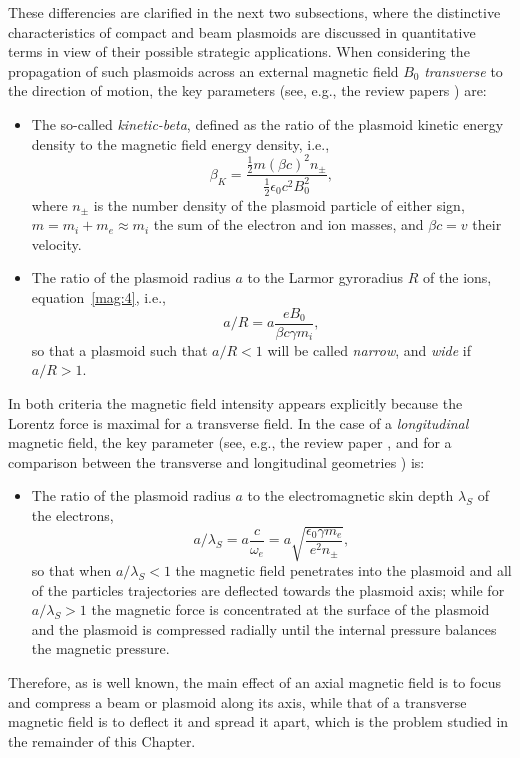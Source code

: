 \documentclass [12pt,a4paper,     ]{report} %
\newcommand{\Oh}{\tfrac{1}{2}}        %
\begin{document}
    These differencies are clarified in the next two subsections, where the distinctive characteristics of compact and beam plasmoids are discussed in quantitative terms in view of their possible strategic applications.  When considering the propagation of such plasmoids across an external magnetic field $B_0$ \emph{transverse} to the direction of motion, the key parameters (see, e.g., the review papers \cite{WESSE1990-, BRENN2005-}) are:
\begin{itemize}
%
\item The so-called \emph{kinetic-beta}, defined as the ratio of the plasmoid kinetic energy density to the magnetic field energy density, i.e.,
%
\begin{equation} \label{pfa:1} 
      \beta_K = \frac{\Oh m (\beta c)^2 n_\pm}{\Oh \epsilon_0 c^2 B_0^2},
\end{equation}
%
where $n_\pm$ is the number density of the plasmoid particle of either sign,  $m = m_i + m_e \approx m_i$ the sum of the electron and ion masses, and $\beta c = v$ their velocity.

\item The ratio of the plasmoid radius $a$ to the Larmor gyroradius $R$ of the ions, equation~\eqref{mag:4}, i.e.,
%
\begin{equation} \label{pfa:2} 
      a/R = a\frac{e B_0}{\beta c\gamma m_i},
\end{equation}
%
so that a plasmoid such that  $a/R < 1$ will be called \emph{narrow}, and \emph{wide} if $a/R > 1$.

\end{itemize}
%
In both criteria the magnetic field intensity appears explicitly because the Lorentz force is maximal for a transverse field.  In the case of a \emph{longitudinal} magnetic field, the key parameter (see, e.g., the review paper \cite{ROBER1983-}, and for a comparison between the transverse and longitudinal geometries \cite{ROBER1981-}) is: 
%
\begin{itemize}

\item The ratio of the plasmoid radius $a$ to the electromagnetic skin depth $\lambda_S$ of the electrons,
%
\begin{equation} \label{pfa:2-} 
      a/\lambda_S = a\frac{c}{\omega_e}
                 = a\sqrt{ \frac{\epsilon_0 \gamma m_e}{e^2 n_\pm} },
\end{equation}
%
so that when $a/\lambda_S < 1$ the magnetic field penetrates into the plasmoid and all of the particles trajectories are deflected towards the plasmoid axis; while for $a/\lambda_S > 1$ the magnetic force is concentrated at the surface of the plasmoid and the plasmoid is compressed radially until the internal pressure balances the magnetic pressure.

\end{itemize}
Therefore, as is well known, the main effect of an axial magnetic field is to focus and compress a beam or plasmoid along its axis, while that of a transverse magnetic field is to deflect it and spread it apart, which is the problem studied in the remainder of this Chapter.
\end{document}
